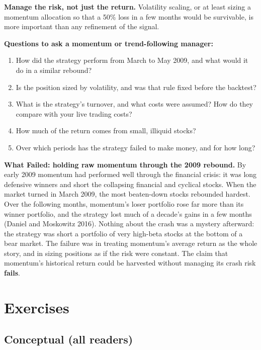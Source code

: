 \textbf{Manage the risk, not just the return.} Volatility scaling, or at least sizing a momentum allocation so that a 50\% loss in a few months would be survivable, is more important than any refinement of the signal.

\textbf{Questions to ask a momentum or trend-following manager:}

\begin{enumerate}
  \item How did the strategy perform from March to May 2009, and what would it do in a similar rebound?
  \item Is the position sized by volatility, and was that rule fixed before the backtest?
  \item What is the strategy's turnover, and what costs were assumed? How do they compare with your live trading costs?
  \item How much of the return comes from small, illiquid stocks?
  \item Over which periods has the strategy failed to make money, and for how long?
\end{enumerate}

\begin{callout}
\textbf{What Failed: holding raw momentum through the 2009 rebound.} By early 2009 momentum had performed well through the financial crisis: it was long defensive winners and short the collapsing financial and cyclical stocks. When the market turned in March 2009, the most beaten-down stocks rebounded hardest. Over the following months, momentum's loser portfolio rose far more than its winner portfolio, and the strategy lost much of a decade's gains in a few months (Daniel and Moskowitz 2016). Nothing about the crash was a mystery afterward: the strategy was short a portfolio of very high-beta stocks at the bottom of a bear market. The failure was in treating momentum's average return as the whole story, and in sizing positions as if the risk were constant. The claim that momentum's historical return could be harvested without managing its crash risk \textbf{fails}.
\end{callout}

\section*{Exercises}

\subsection*{Conceptual (all readers)}

